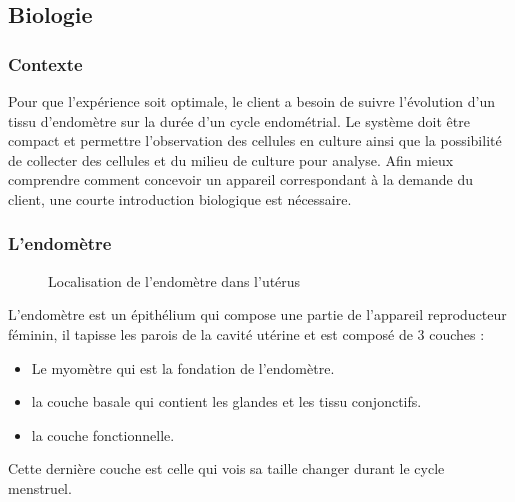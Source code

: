 \documentclass[a4paper, 11pt]{article}
\begin{document}
\subsection{Biologie}
\subsubsection{Contexte}
Pour que l'expérience soit optimale, le client a besoin de suivre l'évolution d'un tissu d'endomètre sur la
durée d'un cycle endométrial.
Le système doit être compact et permettre l'observation des cellules en culture ainsi que la possibilité de
collecter des cellules et du milieu de culture pour analyse.
Afin mieux comprendre comment concevoir un appareil correspondant à la demande du client, une courte
introduction biologique est nécessaire.
\subsubsection{L'endomètre}
\begin{figure}[H]
    \centering
    \caption{Localisation de l'endomètre dans l'utérus}
    \label{fig:Schema_endomètre}
\end{figure}
L'endomètre est un épithélium qui compose une partie de l'appareil reproducteur féminin, il tapisse les
parois de la cavité utérine et est composé de 3 couches :
\begin{itemize}
    \item Le myomètre qui est la fondation de l'endomètre.
    \item la couche basale qui contient les glandes et les tissu conjonctifs.
    \item la couche fonctionnelle.
\end{itemize}
Cette dernière couche est celle qui vois sa taille changer durant le cycle menstruel.
\end{document}
